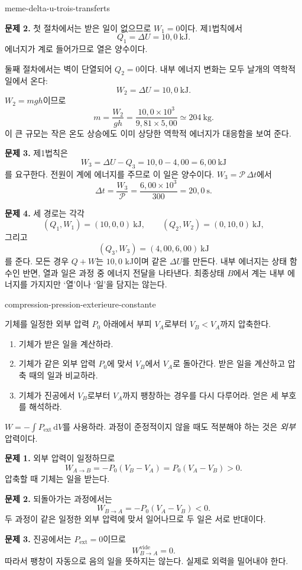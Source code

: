 \begin{exo}[같은 내부 에너지 변화, 세 가지 전달 방식]{meme-delta-u-trois-transferts}
\begin{solution}
\textbf{문제 2.} 첫 절차에서는 받은 일이 없으므로 $W_1=0$이다. 제1법칙에서
\[
Q_1=\Delta U=10{,}0\ \mathrm{kJ}.
\]
에너지가 계로 들어가므로 열은 양수이다.

둘째 절차에서는 벽이 단열되어 $Q_2=0$이다. 내부 에너지 변화는 모두 날개의 역학적 일에서 온다:
\[
W_2=\Delta U=10{,}0\ \mathrm{kJ}.
\]
$W_2=mgh$이므로
\[
m=\frac{W_2}{gh}
=\frac{10{,}0\times10^3}{9{,}81\times5{,}00}
\simeq 204\ \mathrm{kg}.
\]
이 큰 규모는 작은 온도 상승에도 이미 상당한 역학적 에너지가 대응함을 보여 준다.

\textbf{문제 3.} 제1법칙은
\[
W_3=\Delta U-Q_3=10{,}0-4{,}00=6{,}00\ \mathrm{kJ}
\]
를 요구한다. 전원이 계에 에너지를 주므로 이 일은 양수이다.
$W_3=\mathcal P\,\Delta t$에서
\[
\Delta t=\frac{W_3}{\mathcal P}
=\frac{6{,}00\times10^3}{300}
=20{,}0\ \mathrm{s}.
\]

\textbf{문제 4.} 세 경로는 각각
\[
(Q_1,W_1)=(10{,}0,0)\ \mathrm{kJ},
\qquad
(Q_2,W_2)=(0,10{,}0)\ \mathrm{kJ},
\]
그리고
\[
(Q_3,W_3)=(4{,}00,6{,}00)\ \mathrm{kJ}
\]
를 준다. 모든 경우 $Q+W$는 $10{,}0$ kJ이며 같은 $\Delta U$를 만든다.
내부 에너지는 상태 함수인 반면, 열과 일은 과정 중 에너지 전달을 나타낸다.
최종상태 $B$에서 계는 내부 에너지를 가지지만 ‘열’이나 ‘일’을 담지는 않는다.
\end{solution}
\end{exo}

\begin{exo}{compression-pression-exterieure-constante}

기체를 일정한 외부 압력 $P_0$ 아래에서 부피 $V_A$로부터 $V_B<V_A$까지 압축한다.

\begin{enumerate}
\item 기체가 받은 일을 계산하라.
\item 기체가 같은 외부 압력 $P_0$에 맞서 $V_B$에서 $V_A$로 돌아간다. 받은 일을 계산하고 압축 때의 일과 비교하라.
\item 기체가 진공에서 $V_B$로부터 $V_A$까지 팽창하는 경우를 다시 다루어라. 얻은 세 부호를 해석하라.
\end{enumerate}

\begin{indication}
$W=-\int P_{\mathrm{ext}}\,\mathrm{d}V$를 사용하라. 과정이 준정적이지 않을 때도
적분해야 하는 것은 \emph{외부} 압력이다.
\end{indication}

\begin{solution}
\textbf{문제 1.} 외부 압력이 일정하므로
\[
W_{A\to B}=-P_0(V_B-V_A)=P_0(V_A-V_B)>0.
\]
압축할 때 기체는 일을 받는다.

\textbf{문제 2.} 되돌아가는 과정에서는
\[
W_{B\to A}=-P_0(V_A-V_B)<0.
\]
두 과정이 같은 일정한 외부 압력에 맞서 일어나므로 두 일은 서로 반대이다.

\textbf{문제 3.} 진공에서는 $P_{\mathrm{ext}}=0$이므로
\[
W_{B\to A}^{\mathrm{vide}}=0.
\]
따라서 팽창이 자동으로 음의 일을 뜻하지는 않는다. 실제로 외력을 밀어내야 한다.
\end{solution}
\end{exo}

